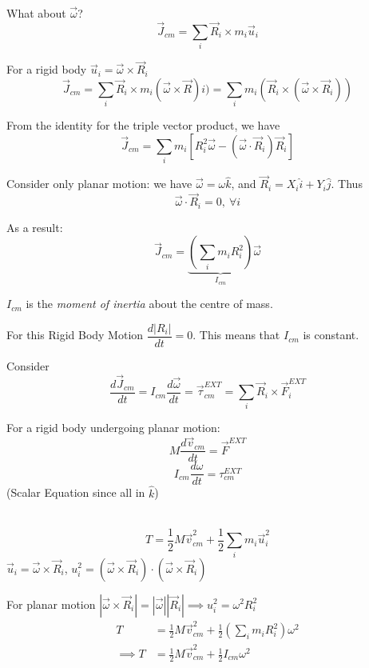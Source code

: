 \documentclass[10pt]{scrartcl}
\begin{document}
What about $\vec{\omega}$?
\[\vec{J}_{cm} = \sum_i\vec{R}_i\times m_i\vec{u}_i\]

For a rigid body $\vec{u}_i = \vec{\omega}\times\vec{R}_i$
\[\vec{J}_{cm} = \sum_i\vec{R}_i \times m_i(\vec{\omega}\times\vec{R})i) = \sum_i m_i(\vec{R}_i\times(\vec{\omega}\times\vec{R}_i))\]

From the identity for the triple vector product, we have
\[\vec{J}_{cm} = \sum_im_i[R_i^2\vec{\omega} - (\vec{\omega}\cdot\vec{R}_i)\vec{R}_i]\]

Consider only planar motion: we have $\vec{\omega} = \omega\hat{k}$, and $\vec{R}_i = X_i\hat{i} + Y_i\hat{j}$. Thus 
\[\vec{\omega}\cdot\vec{R}_i = 0,~\forall i\]

As a result:
\begin{equation}
\vec{J}_{cm} = \underbrace{(\sum_im_iR_i^2)}_{I_{cm}}\vec{\omega}	
\end{equation}

\begin{definition}
$I_{cm}$ is the \emph{moment of inertia} about the centre of mass.	
\end{definition}

For this Rigid Body Motion $\dfrac{d|R_i|}{dt} = 0$. This means that $I_{cm}$ is constant.

Consider
\[\frac{d\vec{J}_{cm}}{dt} = I_{cm}\frac{d\vec{\omega}}{dt} = \vec{\tau}_{cm}^{EXT} = \sum_i\vec{R}_i\times\vec{F}_i^{EXT}\]

For a rigid body undergoing planar motion:
\begin{equation}M\frac{d\vec{v}_{cm}}{dt} = \vec{F}^{EXT}\end{equation}
\begin{equation}I_{cm}\frac{d{\omega}}{dt} = {\tau}_{cm}^{EXT}\end{equation}
 (Scalar Equation since all in $\hat{k}$)
 
~
\[T = \frac{1}{2}M\vec{v}_{cm}^2 + \frac{1}{2}\sum_im_i\vec{u}_i^2\]
$\vec{u}_i = \vec{\omega} \times \vec{R}_i$, $u_i^ 2 = (\vec{\omega}\times\vec{R}_i) \cdot (\vec{\omega}\times\vec{R}_i)$

For planar motion $|\vec{\omega}\times\vec{R}_i| = |\vec{\omega}||\vec{R}_i| \implies u_i^2 = \omega^2R_i^2$
\[\begin{aligned}T &= \frac{1}{2}M\vec{v}_{cm}^2 + \frac{1}{2}\left(\sum_im_i{R}_i^2\right)\omega^2\\
\implies 	T &= \frac{1}{2}M\vec{v}_{cm}^2 + \frac{1}{2}I_{cm}\omega^2
\end{aligned}
\]
\end{document}
